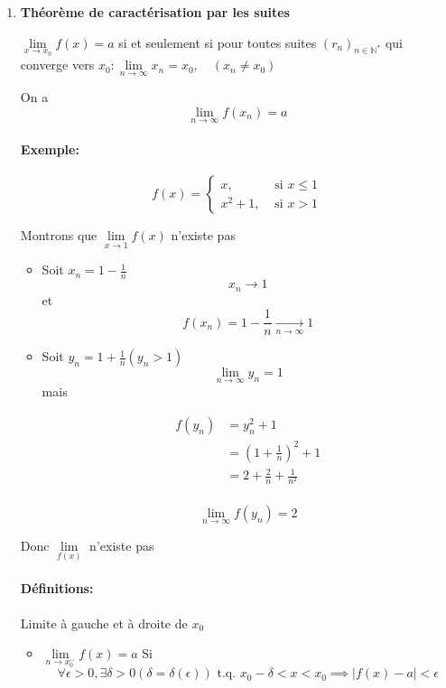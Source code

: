 \documentclass[
    11pt,
    a4paper,
    oneside,
    headinlcude, footinclude,
    twoside,
]{report}
\newcommand{\tq}[0]{\textrm{ t.q. }}
\begin{document}
\begin{enumerate}
\item \textbf{Théorème de caractérisation par les suites} 

$\lim\limits_{x \to x_{0}} f(x) = a$ si et seulement si pour toutes
suites $(r_{n})_{n \in \mathbb{N}^{*}}$ qui converge vers $x_{0}:
\lim\limits_{n \to \infty} x_{n} = x_{0}, \quad (x_{n} \neq x_{0})$ 

On a $$ \lim_{n \to \infty} f(x_{n}) = a$$

\paragraph{Exemple:}
        
$$f(x) = \left\{\begin{array}{lr}x, & \text{ si } x \leq 1\\ x^{2} +
1, & \text{ si } x>1\end{array}\right.$$
        
Montrons que $\lim\limits_{x \to 1} f (x)$ n'existe pas

\begin{itemize}
\item Soit $x_{n} = 1 - \frac{1}{n}$  $$x_{n} \to 1$$ et $$f(x_{n})
= 1 - \frac{1}{n} \xrightarrow[n \to \infty]{} 1$$

\item Soit $y_{n} = 1 + \frac{1}{n} (y_{n} > 1)$ $$ \lim_{n \to \infty} y_{n}
= 1$$
mais 

\[
\begin{split}
f (y_{n}) &= y_{n}^{2} + 1 \\
&= \left(1 + \frac{1}{n}\right)^{2} + 1\\
&= 2 + \frac{2}{n} + \frac{1}{n^{2}}\\
\end{split}
\]

$$ \lim_{n \to \infty} f(y_{n}) = 2 $$
\end{itemize}

Donc $\lim\limits_{f(x)}$ n'existe pas

\paragraph{Définitions:}
        
Limite à gauche et à droite de $x_{0}$ 

\begin{itemize}
\item $\lim\limits_{n \to x_{0}^{-}} f (x) = a $ Si 
$$\forall \epsilon > 0, \exists \delta > 0 (\delta = \delta(\epsilon))
\tq x_{0}-\delta < x < x_{0} \implies |f(x) - a| < \epsilon$$


\end{itemize}
\end{enumerate}
\end{document}
